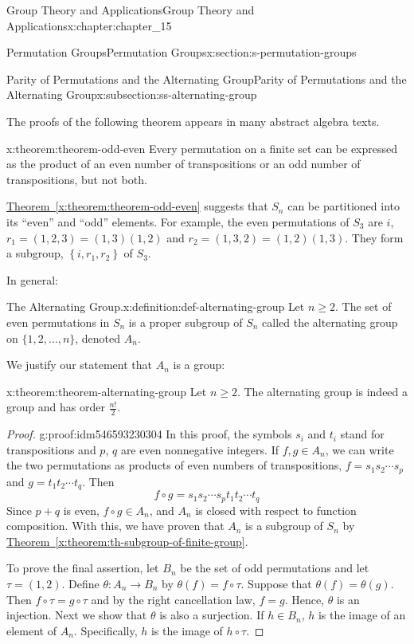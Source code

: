 \documentclass[oneside,10pt,]{book}
\newcommand{\xreffont}{\relax}
\numberwithin{equation}{section}
\begin{document}
\begin{chapterptx}{Group Theory and Applications}{}{Group Theory and Applications}{}{}{x:chapter:chapter_15}
\begin{sectionptx}{Permutation Groups}{}{Permutation Groups}{}{}{x:section:s-permutation-groups}
\begin{subsectionptx}{Parity of Permutations and the Alternating Group}{}{Parity of Permutations and the Alternating Group}{}{}{x:subsection:ss-alternating-group}
\par
The proofs of the following  theorem appears in many abstract algebra texts.%
\begin{theorem}{}{}{x:theorem:theorem-odd-even}%
Every permutation on a finite set can be expressed as the product of an even number of transpositions or an odd number of transpositions, but not both.%
\end{theorem}
\hyperref[x:theorem:theorem-odd-even]{Theorem~{\xreffont\ref{x:theorem:theorem-odd-even}}} suggests that \(S_n\) can be partitioned into its ``even'' and ``odd'' elements. For example, the even permutations of \(S_3\) are \(i\), \(r_1=(1,2,3)=(1,3)(1,2)\) and \(r_2=(1,3,2)=(1,2)(1,3)\).  They form a subgroup, \(\left\{i,r_1,r_2\right\}\) of  \(S_3\).%
\par
In general:%
\begin{definition}{The Alternating Group.}{x:definition:def-alternating-group}%
%
\label{g:notation:idm546593234704}%
Let \(n \geq 2\). The set of even permutations in \(S_n\) is a proper subgroup of \(S_n\) called the alternating group on \(\{1, 2, \ldots, n\}\), denoted \(A_n\).%
\end{definition}
We justify our statement that \(A_n\) is a group:%
\begin{theorem}{}{}{x:theorem:theorem-alternating-group}%
Let \(n \geq 2\). The alternating group is indeed a group and has order \(\frac{n!}{2}\).%
\end{theorem}
\begin{proof}{}{g:proof:idm546593230304}
In this proof, the symbols \(s_i\) and \(t_i\) stand for transpositions and \(p\), \(q\) are even  nonnegative integers. If  \(f, g \in A_n\),  we can write the two permutations as products of even numbers of transpositions, \(f=s_1s_2\cdots  s_p\) and \(g=t_1t_2\cdots  t_q\).  Then%
\begin{equation*}
f\circ g=s_1s_2\cdots  s_pt_1t_2\cdots  t_q
\end{equation*}
Since \(p+q\) is even, \(f\circ g \in A_n\), and \(A_n\) is closed with respect to function composition.  With this, we have proven that \(A_n\) is a subgroup of \(S_n\) by \hyperref[x:theorem:th-subgroup-of-finite-group]{Theorem~{\xreffont\ref{x:theorem:th-subgroup-of-finite-group}}}.%
\par
To prove the final assertion, let \(B_n\) be the set of odd permutations and let \(\tau  = (1,2)\). Define \(\theta: A_n \to  B_n\) by \(\theta(f) = f\circ \tau\). Suppose that \(\theta(f) = \theta(g)\). Then \(f\circ \tau  = g\circ \tau \) and by the right cancellation law,  \(f = g\). Hence, \(\theta\) is an injection.  Next we show that \(\theta\) is also a surjection.  If \(h \in  B_n\), \(h\) is the image of an element of \(A_n\).  Specifically, \(h\) is the image of \(h\circ \tau\).%

\end{proof}
\end{subsectionptx}
\end{sectionptx}
\end{chapterptx}
\end{document}
